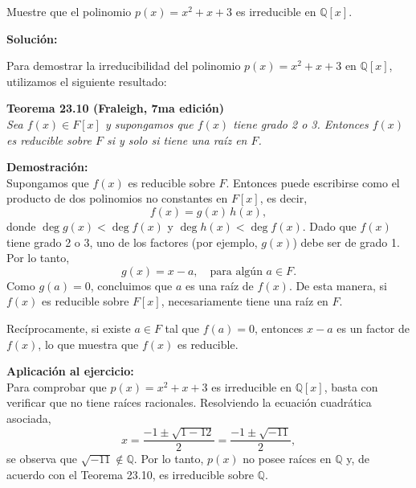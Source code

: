 Muestre que el polinomio \( p(x) = x^2 + x + 3 \) es irreducible en \( \mathbb{Q}[x] \).

\textbf{Solución:}

Para demostrar la irreducibilidad del polinomio \( p(x) = x^2 + x + 3 \) en \( \mathbb{Q}[x] \), utilizamos el siguiente resultado:

\textbf{Teorema 23.10 (Fraleigh, 7ma edición)}\\
\textit{
Sea \( f(x) \in F[x] \) y supongamos que \( f(x) \) tiene grado 2 o 3. Entonces \( f(x) \) es reducible sobre \( F \) si y solo si tiene una raíz en \( F \).
}

\textbf{Demostración:}\\
Supongamos que \( f(x) \) es reducible sobre \( F \). Entonces puede escribirse como el producto de dos polinomios no constantes en \( F[x] \), es decir,
\[
f(x) = g(x)\,h(x),
\]
donde \(\deg g(x) < \deg f(x)\) y \(\deg h(x) < \deg f(x)\). 
Dado que \( f(x) \) tiene grado 2 o 3, uno de los factores (por ejemplo, \( g(x) \)) debe ser de grado 1. Por lo tanto, 
\[
g(x) = x - a, \quad \text{para algún } a \in F.
\]
Como \( g(a) = 0 \), concluimos que \( a \) es una raíz de \( f(x) \). 
De esta manera, si \( f(x) \) es reducible sobre \( F[x] \), necesariamente tiene una raíz en \( F \).

Recíprocamente, si existe \( a \in F \) tal que \( f(a) = 0 \), entonces \( x - a \) es un factor de \( f(x) \), lo que muestra que \( f(x) \) es reducible.

\textbf{Aplicación al ejercicio:}\\
Para comprobar que \( p(x) = x^2 + x + 3 \) es irreducible en \(\mathbb{Q}[x]\), basta con verificar que no tiene raíces racionales. 
Resolviendo la ecuación cuadrática asociada,
\[
x = \frac{-1 \pm \sqrt{1 - 12}}{2} 
   = \frac{-1 \pm \sqrt{-11}}{2},
\]
se observa que \(\sqrt{-11}\notin \mathbb{Q}\). 
Por lo tanto, \( p(x) \) no posee raíces en \(\mathbb{Q}\) y, de acuerdo con el Teorema 23.10, es irreducible sobre \(\mathbb{Q}\).
